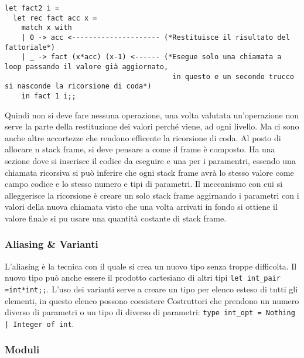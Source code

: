 \documentclass{article}
\begin{document}
\begin{verbatim}
let fact2 i =
  let rec fact acc x =
    match x with
    | 0 -> acc <--------------------- (*Restituisce il risultato del fattoriale*)
    | _ -> fact (x*acc) (x-1) <------ (*Esegue solo una chiamata a loop passando il valore già aggiornato,
                                        in questo e un secondo trucco si nasconde la ricorsione di coda*)
    in fact 1 i;;
\end{verbatim}

\vspace*{0.5cm}

\hspace*{0.5cm}Quindi non si deve fare nessuna operazione, una volta valutata un'operazione non serve la parte della restituzione dei valori perché viene, ad ogni livello.
Ma ci sono anche altre accortezze che rendono efficente la ricorsione di coda. Al posto di allocare n stack frame, si deve pensare a come il frame è composto.
Ha una sezione dove si inserisce il codice da eseguire e una per i paramentri, essendo una chiamata ricorsiva si può inferire che ogni stack frame avrà lo stesso valore come campo codice e lo stesso numero e tipi di parametri.
Il meccanismo con cui si alleggerisce la ricorsione è creare un solo stack frame aggirnando i parametri con i valori della nuova chiamata visto che una volta arrivati in fondo si ottiene il valore finale si pu usare una quantità costante di stack frame. 

\vspace*{0.5cm}

\subsubsection{Aliasing \& Varianti}

\vspace*{0.5cm}L'aliasing è la tecnica con il quale si crea un nuovo tipo senza troppe difficolta.
Il nuovo tipo può anche essere il prodotto cartesiano di altri tipi \texttt{let int\_pair =int*int;;}.\newline
\hspace*{0.5cm}L'uso dei varianti serve a creare un tipo per elenco esteso di tutti gli elementi, in questo elenco possono coesistere Costruttori che prendono un numero diverso di parametri o un tipo di diverso di parametri:
\texttt{type int\_opt = Nothing | Integer of int}.

\subsubsection{Moduli}
\end{document}
